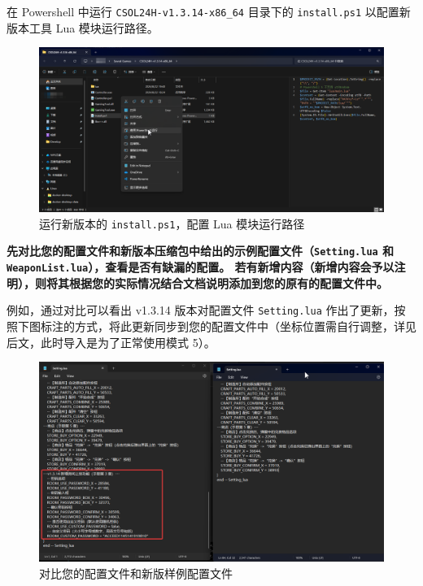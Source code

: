 在 Powershell 中运行 \lstinline{CSOL24H-v1.3.14-x86_64} 目录下的 \lstinline{install.ps1} 以配置新版本工具 Lua 模块运行路径。

\begin{figure}[H]
    \Centering
    \includegraphics[width=\textwidth]{docs/assets/update/run_install.png}
    \caption{运行新版本的 \lstinline{install.ps1}，配置 Lua 模块运行路径}
\end{figure}

\textbf{\color{red} 先对比您的配置文件和新版本压缩包中给出的示例配置文件（\lstinline{Setting.lua} 和 \lstinline{WeaponList.lua}），查看是否有缺漏的配置。
若有新增内容（新增内容会予以注明），则将其根据您的实际情况结合文档说明添加到您的原有的配置文件中。}

例如，通过对比可以看出 v1.3.14 版本对配置文件 \lstinline{Setting.lua} 作出了更新，按照下图标注的方式，将此更新同步到您的配置文件中（坐标位置需自行调整，详见后文，此时导入是为了正常使用模式 5）。

\begin{figure}[H]
    \Centering
    \includegraphics[width=\textwidth]{docs/assets/update/replace_01.png}
    \caption{对比您的配置文件和新版样例配置文件}
\end{figure}

